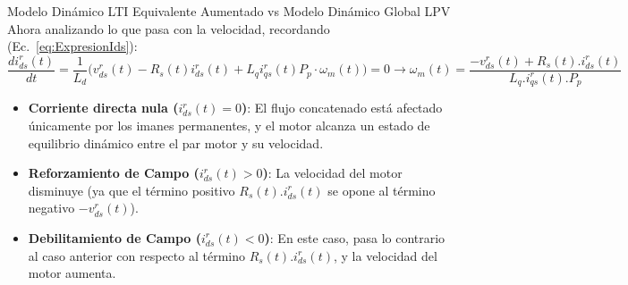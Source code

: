 \documentclass[12pt]{beamer}
\begin{document}
\begin{frame}{\small Modelo Dinámico LTI Equivalente Aumentado vs Modelo Dinámico Global LPV}\scriptsize
Ahora analizando lo que pasa con la velocidad, recordando (Ec.~\ref{eq:ExpresionIds}):
 \begin{equation*}
     \frac{d i_{ds}^r(t)}{dt} = \frac{1}{L_d} \Big( v_{ds}^r(t) - R_s(t) i_{ds}^r(t) + L_q i_{qs}^r(t) P_p \cdot \omega_m(t) \Big) = 0 \rightarrow \omega_m(t) = \frac{-v^r_{ds}(t) + R_s(t).i^r_{ds}(t)}{L_q.i^r_{qs}(t).P_p}
 \end{equation*}

\begin{itemize}
    \item \textbf{Corriente directa nula (\(i^r_{ds}(t) = 0\))}: El flujo concatenado está afectado únicamente por los imanes permanentes, y el motor alcanza un estado de equilibrio dinámico entre el par motor y su velocidad.
    
    \item \textbf{Reforzamiento de Campo (\(i^r_{ds}(t) > 0\))}: La velocidad del motor disminuye (ya que el término positivo $R_s(t).i^r_{ds}(t)$ se opone al término negativo $-v^r_{ds}(t)$). 
    
    \item \textbf{Debilitamiento de Campo (\(i^r_{ds}(t) < 0\))}: En este caso, pasa lo contrario al caso anterior con respecto al término $R_s(t).i^r_{ds}(t)$, y la velocidad del motor aumenta.
\end{itemize}
\end{frame}
\end{document}
